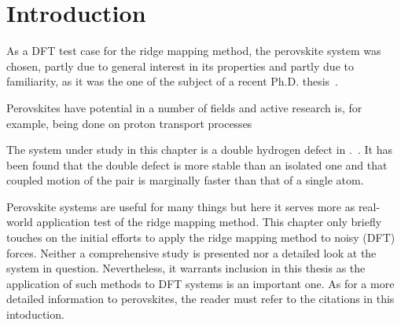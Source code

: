 \section{Introduction}
\label{sec:perovskites-introduction}

As a DFT test case for the ridge mapping method, the  perovskite system was chosen, partly due to general interest in its properties and partly due to familiarity, as it was the one of the subject of a recent Ph.D. thesis~\cite{nicolai-2010}.

Perovskites have potential in a number of fields and active research is, for example, being done on proton transport processes~\cite{perovskites-hydrogen-diffusion-2007, perovskites-proton-transport-2008}

The system under study in this chapter is a double hydrogen defect in .~\cite{double-defect-2011}.
It has been found that the double defect is more stable than an isolated one and that coupled motion of the pair is marginally faster than that of a single atom.

Perovskite systems are useful for many things but here it serves more as real-world application test of the ridge mapping method.
This chapter only briefly touches on the initial efforts to apply the ridge mapping method to noisy (DFT) forces.
Neither a comprehensive study is presented nor a detailed look at the system in question.
Nevertheless, it warrants inclusion in this thesis as the application of such methods to DFT systems is an important one.
As for a more detailed information to perovskites, the reader must refer to the citations in this intoduction.





